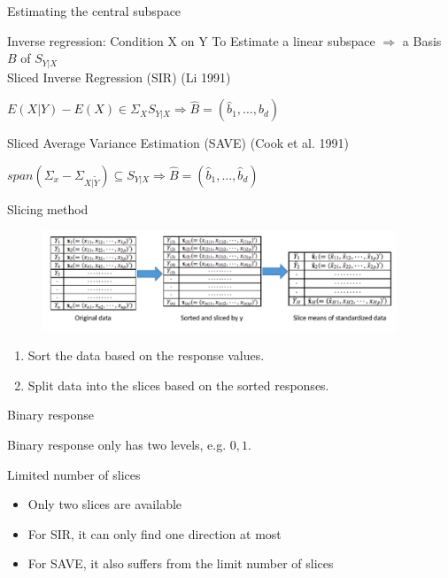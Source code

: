 \documentclass[ignorenonframetext,]{beamer}
\providecommand{\tightlist}{%
  \setlength{\itemsep}{0pt}\setlength{\parskip}{0pt}}
\begin{document}
\begin{frame}{Estimating the central subspace}

\begin{block}{Inverse regression: Condition X on Y} 
To Estimate a linear subspace $\Rightarrow$ a Basis $B$ of $S_{Y|X}$ \\
Sliced Inverse Regression (SIR) (Li 1991)    
\begin{center}
$E(X|Y) - E(X) \in \Sigma_XS_{Y|X} \Rightarrow \hat{B} = (\hat{b}_1, \dots, \hat{b}_d)$   
\end{center}

Sliced Average Variance Estimation (SAVE) (Cook et al. 1991)     
\begin{center}
$span(\Sigma_x - \Sigma_{X|\tilde{Y}}) \subseteq S_{Y|X} \Rightarrow \hat{B} = (\hat{b}_1, \dots, \hat{b}_d)$
\end{center}

\end{block}

\end{frame}

\begin{frame}{Slicing method}

\begin{figure}
\centering
\includegraphics[width=4.16667in]{./pic/slice method.png}
\caption{}
\end{figure}

\begin{enumerate}
\def\labelenumi{\arabic{enumi}.}
\tightlist
\item
  Sort the data based on the response values.\\
\item
  Split data into the slices based on the sorted responses.
\end{enumerate}

\end{frame}

\begin{frame}{Binary response}

Binary response only has two levels, e.g. \(0,1\).

\begin{block}{Limited number of slices}

\begin{itemize}
\tightlist
\item
  Only two slices are available\\
\item
  For SIR, it can only find one direction at most\\
\item
  For SAVE, it also suffers from the limit number of slices
\end{itemize}

\end{block}

\end{frame}
\end{document}
